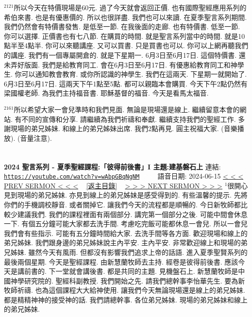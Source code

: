 \documentclass{book}
\begin{document}
$^{2121}$所以今天在特價現場是60元.
過了今天就會返回正價.
也有國際聖經應用系列的希伯來書.
也是有優惠價的.
所以也很詳盡.
我們也可以來讀.
在夏季聖言系列期間.
我們仍然會有特價書發售.
是低至一節.
在我後面的走廊.
也有特價書.
低至一節.
你可以選擇.
正價書也有七八節.
在購買的時間.
就是聖言系列當中的時間.
就是10點半至4點半.
你可以來聽講座.
又可以買書.
只是買書也可以.
你可以上網再聽我們的講座.
我們有一個專屬開倉的.
就是下星期一.
6月3日至6月17日.
這個特價書.
還未弄好版面.
我們是給教育同工.
會在6月3日至6月17日.
有優惠給教育同工和神學生.
你可以通知教會教育.
或你所認識的神學生.
我們在這兩天.
下星期一就開始了.
6月3日至6月17日.
這兩天下午1點至5點.
都可以親臨本會購買.
今天下午2點仍然有梁國權老師.
為我們主持福音書.
耶穌基督的福音.
今天是看馬太福音.

$^{2161}$所以希望大家一會兒準時和我們見面.
無論是現場還是線上.
繼續留意本會的網站.
有不同的宣傳和分享.
請繼續為我們祈禱和奉獻.
繼續支持我們的聖經工作.
多謝現場的弟兄姊妹.
和線上的弟兄姊妹出席.
我們2點再見.
圓主祝福大家.
(音樂播放).
(音量注意).
\newpage



\section{}
\label{sec:wAbpGBqNgNM}
\textbf{2024 聖言系列 - 夏季聖經課程:「彼得前後書」I 主題:建基磐石上}
\newline
\newline
連結: \href{https://youtube.com/watch?v=wAbpGBqNgNM}{\texttt{https://youtube.com/watch?v=wAbpGBqNgNM}} ~~~~ 語音日期: 2024-06-15
\newline
\newline
\hyperref[sec:7R3qM5b7DMI]{\small{< < < PREV SERMON < < <}}
~
\hyperref[sec:index]{\small{[返主目錄]}}
~
\hyperref[sec:evqz1q_hC_A]{\small{> > > NEXT SERMON > > >}}
\newline
\newline
$^{1}$很開心見到現場的弟兄姊妹.
亦見到線上的弟兄姊妹是感受得到的.
有些溫馨的提示.
先將你們的手機調校靜音.
或者關掉它.
讓我們今天的流程都是順暢的.
今日新牧師都比較少建議我們.
我們的課程裡面有兩個部分.
講完第一個部分之後.
可能中間會休息一下.
有個五分鐘可能大家都去洗手間.
考慮吃完飯可能都休息一會兒.
所以一會兒我們會有些指示.
可能有五分鐘時間給大家.
去洗手間等各方面.
歡迎現場和線上的弟兄姊妹.
我們跟身邊的弟兄姊妹說主內平安.
主內平安.
非常歡迎線上和現場的弟兄姊妹.
雖然今天有風雨.
但都沒有影響我們追求上帝的話語.
進入夏季聖賢系列的最後兩個星期.
今天是聖經課程.
由新慧蘭牧師去主持.
經卷是彼得前後書.
應該今天是講前書的.
下一堂就會講後書.
都是共同的主題.
見機盤石上.
新慧蘭牧師是中國神學研究院的.
聖經科副教授.
我們開始之先.
請我們總幹事李怡華先生.
要為新牧師祈禱.
也為這個課程大大給神使用.
讓我們今天無論現場還是線上的弟兄姊妹.
都是精精神神的接受神的話.
我們請總幹事.
各位弟兄姊妹.
現場的弟兄姊妹和線上的弟兄姊妹.
\end{document}
